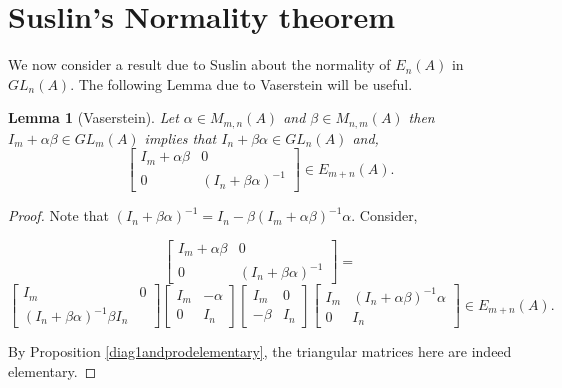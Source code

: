 \documentclass[12pt]{report}
\numberwithin{equation}{section}
\newcounter{dummy} \numberwithin{dummy}{section}
\newtheorem{lemma}[dummy]{Lemma}
\begin{document}
	\section{Suslin's Normality theorem}
		We now consider a result due to Suslin about the normality of $E_n(A) $ in $GL_n(A)$. The following Lemma due to Vaserstein will be useful.
		\begin{lemma}[Vaserstein]\label{vasersteinlem}
			Let $\alpha \in M_{m,n} (A)$ and $\beta \in M_{n,m}(A)$ then $I_m+\alpha \beta \in GL_m(A)$ implies that $I_n+\beta \alpha \in GL_n(A)$ and, \[ \begin{bmatrix}
				I_m+\alpha \beta & 0 \\ 0 & (I_n+\beta \alpha)^{-1}
			\end{bmatrix} \in E_{m+n} (A).\] 
		\end{lemma}
		\begin{proof}
			Note that $(I_n+\beta \alpha )^{-1}=I_n-\beta (I_m+\alpha \beta )^{-1} \alpha$. Consider,

			
			\[ \begin{bmatrix}
				I_m+\alpha \beta & 0 \\ 0 & (I_n+\beta \alpha)^{-1}
			\end{bmatrix} =
			\]
			\(\begin{bmatrix}
			I_m & 0 \\
			(I_n+\beta \alpha )^{-1}\beta I_n
			\end{bmatrix}\begin{bmatrix}
			I_m & -\alpha \\
			0 & I_n
			\end{bmatrix} \begin{bmatrix}
			I_m & 0\\
			-\beta  & I_n
			\end{bmatrix} \begin{bmatrix}
			I_m & (I_n+\alpha \beta )^{-1} \alpha \\
			0 & I_n
			\end{bmatrix}\in E_{m+n} (A).\)
			 
			By Proposition \ref{diag1andprodelementary}, the triangular matrices here are indeed elementary.
		\end{proof}
		
\end{document}
